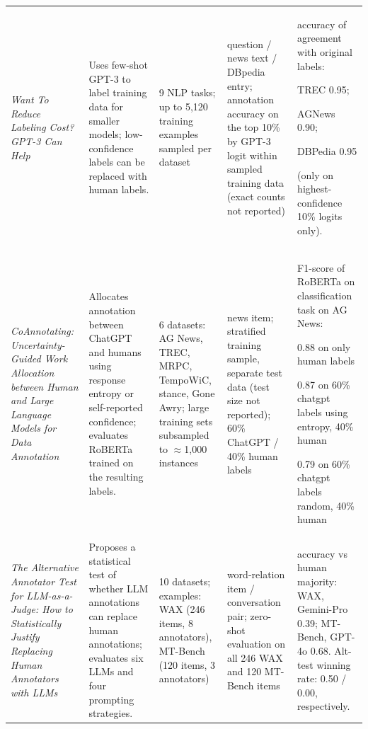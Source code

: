 \documentclass[11pt]{article}
\begin{document}
\begin{table}[t!]
\begin{tabular}{@{}P{0.19\textwidth} P{0.19\textwidth} P{0.13\textwidth} P{0.17\textwidth} P{0.25\textwidth}@{}}
\textit{Want To Reduce Labeling Cost? GPT-3 Can Help} \cite{want-to-reduce-gpt3} & Uses few-shot GPT-3 to label training data for smaller models; low-confidence labels can be replaced with human labels. & 9 NLP tasks; up to 5,120 training examples sampled per dataset & question / news text / DBpedia entry; annotation accuracy on the top 10\% by GPT-3 logit within sampled training data (exact counts not reported) & 

accuracy of agreement with original labels: 

TREC 0.95;

AGNews 0.90;

DBPedia 0.95 

(only on highest-confidence 10\% logits only).



\\


\textit{CoAnnotating: Uncertainty-Guided Work Allocation between Human and Large Language Models for Data Annotation} \cite{coannotating-uncertainty} & Allocates annotation between ChatGPT and humans using response entropy or self-reported confidence; evaluates RoBERTa trained on the resulting labels. & 6 datasets: AG News, TREC, MRPC, TempoWiC, stance, Gone Awry; large training sets subsampled to $\approx$1,000 instances & news item; stratified training sample, separate test data (test size not reported); 60\% ChatGPT / 40\% human labels 
& F1-score of RoBERTa on classification task on AG News:

0.88 on only human labels

0.87 on 60\% chatgpt labels using entropy, 40\% human

0.79 on 60\% chatgpt labels random, 40\% human


\\

\textit{The Alternative Annotator Test for LLM-as-a-Judge: How to Statistically Justify Replacing Human Annotators with LLMs} \cite{the-altern-annot} & Proposes a statistical test of whether LLM annotations can replace human annotations; evaluates six LLMs and four prompting strategies. & 10 datasets; examples: WAX (246 items, 8 annotators), MT-Bench (120 items, 3 annotators) & word-relation item / conversation pair; zero-shot evaluation on all 246 WAX and 120 MT-Bench items & accuracy vs human majority: WAX, Gemini-Pro 0.39; MT-Bench, GPT-4o 0.68. Alt-test winning rate: 0.50 / 0.00, respectively.

\\


\end{tabular}
\end{table}
\end{document}
